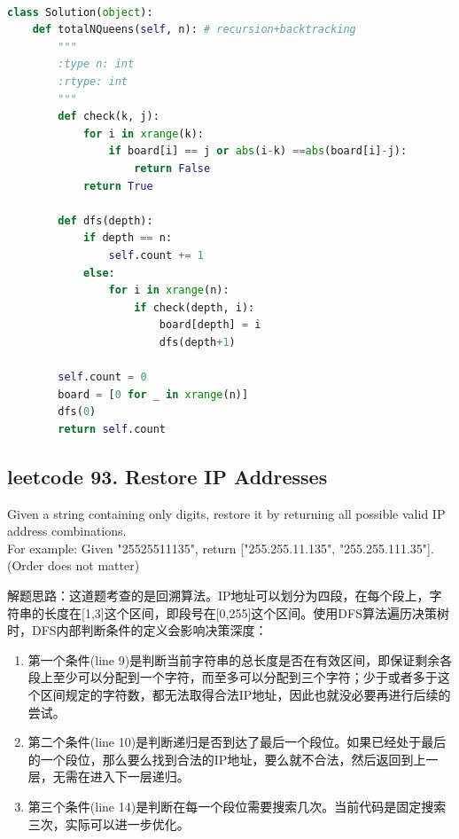 \documentclass[a4paper,10pt]{article}
\begin{document}
\begin{lstlisting}[language=Python, caption=Problem52. N-Queens II]

class Solution(object):
    def totalNQueens(self, n): # recursion+backtracking
        """
        :type n: int
        :rtype: int
        """
        def check(k, j):
            for i in xrange(k):
                if board[i] == j or abs(i-k) ==abs(board[i]-j):
                    return False
            return True

        def dfs(depth):
            if depth == n:
                self.count += 1
            else:
                for i in xrange(n):
                    if check(depth, i):
                        board[depth] = i
                        dfs(depth+1)

        self.count = 0
        board = [0 for _ in xrange(n)]
        dfs(0)
        return self.count
\end{lstlisting}



\subsection{leetcode 93. Restore IP Addresses}
Given a string containing only digits, restore it by returning all possible valid IP address combinations. \\

\noindent For example: Given "25525511135", return ["255.255.11.135", "255.255.111.35"]. (Order does not matter) \\

\begin{CJK*}{UTF8}{gbsn}
\noindent 解题思路：这道题考查的是回溯算法。IP地址可以划分为四段，在每个段上，字符串的长度在[1,3]这个区间，即段号在[0,255]这个区间。使用DFS算法遍历决策树时，DFS内部判断条件的定义会影响决策深度：
\begin{enumerate}
    \item 第一个条件(line 9)是判断当前字符串的总长度是否在有效区间，即保证剩余各段上至少可以分配到一个字符，而至多可以分配到三个字符；少于或者多于这个区间规定的字符数，都无法取得合法IP地址，因此也就没必要再进行后续的尝试。
    \item 第二个条件(line 10)是判断递归是否到达了最后一个段位。如果已经处于最后的一个段位，那么要么找到合法的IP地址，要么就不合法，然后返回到上一层，无需在进入下一层递归。
    \item 第三个条件(line 14)是判断在每一个段位需要搜索几次。当前代码是固定搜索三次，实际可以进一步优化。
\end{enumerate}
\end{CJK*}
\end{document}
